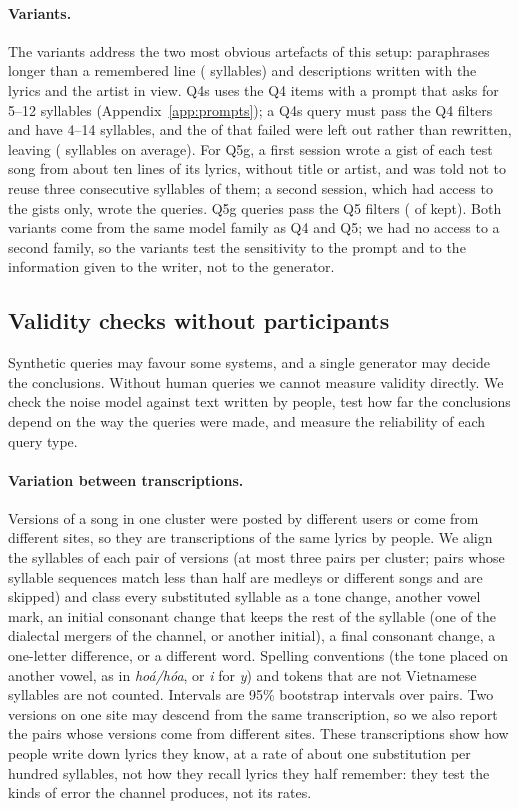 \documentclass[11pt]{article}
\newcommand{\vi}[1]{\textit{#1}}          %
\newcommand{\Qfour}{Q4\xspace}
\newcommand{\Qfive}{Q5\xspace}
\begin{document}
\paragraph{Variants.} The variants address the two most obvious artefacts of this setup: paraphrases longer
than a remembered line (\LenFour{} syllables) and descriptions written with the lyrics and the artist in view.
Q4s uses the \Qfour{} items with a prompt that asks for 5--12 syllables (Appendix~\ref{app:prompts}); a Q4s
query must pass the \Qfour{} filters and have 4--14 syllables, and the \VarQfourSRejected{} of
\VarQfourSWritten{} that failed were left out rather than rewritten, leaving \NTestFourS{} (\LenFourS{}
syllables on average). For Q5g, a first session wrote a gist of each test song from about ten lines of its
lyrics, without title or artist, and was told not to reuse three consecutive syllables of them; a second
session, which had access to the gists only, wrote the queries. Q5g queries pass the \Qfive{} filters
(\NTestFiveG{} of \VarQfiveGWritten{} kept). Both variants come from the same model family as \Qfour{} and
\Qfive{}; we had no access to a second family, so the variants test the sensitivity to the prompt and to the
information given to the writer, not to the generator.

\subsection{Validity checks without participants}\label{sec:validity}
Synthetic queries may favour some systems, and a single generator may decide the conclusions. Without human
queries we cannot measure validity directly. We check the noise model against text written by people, test how
far the conclusions depend on the way the queries were made, and measure the reliability of each query type.

\paragraph{Variation between transcriptions.} Versions of a song in one cluster were posted by different users
or come from different sites, so they are transcriptions of the same lyrics by people. We align the syllables
of each pair of versions (at most three pairs per cluster; pairs whose syllable sequences match less than half
are medleys or different songs and are skipped) and class every substituted syllable as a tone change,
another vowel mark, an initial consonant change that keeps the rest of the syllable (one of the dialectal
mergers of the channel, or another initial), a final consonant change, a one-letter difference, or a
different word. Spelling conventions (the tone placed on another vowel, as in \vi{hoá/hóa}, or \vi{i} for
\vi{y}) and tokens that are not Vietnamese syllables are not counted. Intervals are 95\% bootstrap intervals
over pairs. Two versions on one site may descend from the same transcription, so we also report the pairs
whose versions come from different sites. These transcriptions show how people write down lyrics they know,
at a rate of about one substitution per hundred syllables, not how they recall lyrics they half remember:
they test the kinds of error the channel produces, not its rates.
\end{document}
